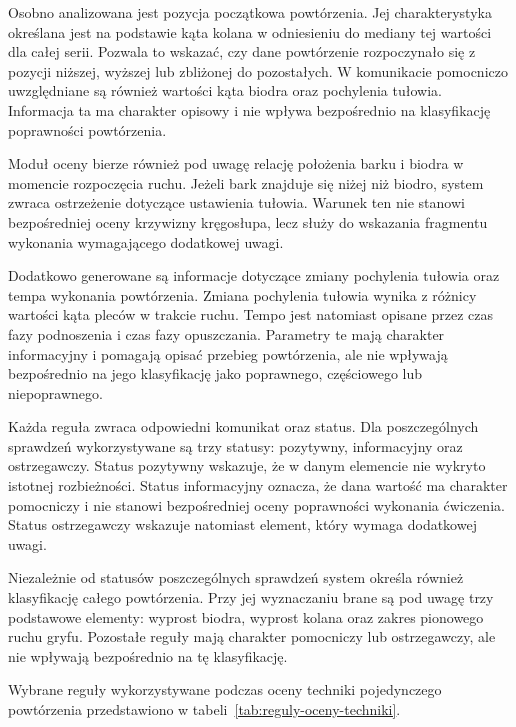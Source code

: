 Osobno analizowana jest pozycja początkowa powtórzenia. Jej charakterystyka określana jest na podstawie kąta kolana w odniesieniu do mediany tej wartości dla całej serii. Pozwala to wskazać, czy dane powtórzenie rozpoczynało się z pozycji niższej, wyższej lub zbliżonej do pozostałych. W komunikacie pomocniczo uwzględniane są również wartości kąta biodra oraz pochylenia tułowia. Informacja ta ma charakter opisowy i nie wpływa bezpośrednio na klasyfikację poprawności powtórzenia.

Moduł oceny bierze również pod uwagę relację położenia barku i biodra w momencie rozpoczęcia ruchu. Jeżeli bark znajduje się niżej niż biodro, system zwraca ostrzeżenie dotyczące ustawienia tułowia. Warunek ten nie stanowi bezpośredniej oceny krzywizny kręgosłupa, lecz służy do wskazania fragmentu wykonania wymagającego dodatkowej uwagi.

Dodatkowo generowane są informacje dotyczące zmiany pochylenia tułowia oraz tempa wykonania powtórzenia. Zmiana pochylenia tułowia wynika z różnicy wartości kąta pleców w trakcie ruchu. Tempo jest natomiast opisane przez czas fazy podnoszenia i czas fazy opuszczania. Parametry te mają charakter informacyjny i pomagają opisać przebieg powtórzenia, ale nie wpływają bezpośrednio na jego klasyfikację jako poprawnego, częściowego lub niepoprawnego.

Każda reguła zwraca odpowiedni komunikat oraz status. Dla poszczególnych sprawdzeń wykorzystywane są trzy statusy: pozytywny, informacyjny oraz ostrzegawczy. Status pozytywny wskazuje, że w danym elemencie nie wykryto istotnej rozbieżności. Status informacyjny oznacza, że dana wartość ma charakter pomocniczy i nie stanowi bezpośredniej oceny poprawności wykonania ćwiczenia. Status ostrzegawczy wskazuje natomiast element, który wymaga dodatkowej uwagi.

Niezależnie od statusów poszczególnych sprawdzeń system określa również klasyfikację całego powtórzenia. Przy jej wyznaczaniu brane są pod uwagę trzy podstawowe elementy: wyprost biodra, wyprost kolana oraz zakres pionowego ruchu gryfu. Pozostałe reguły mają charakter pomocniczy lub ostrzegawczy, ale nie wpływają bezpośrednio na tę klasyfikację.

Wybrane reguły wykorzystywane podczas oceny techniki pojedynczego powtórzenia przedstawiono w tabeli~\ref{tab:reguly-oceny-techniki}.

